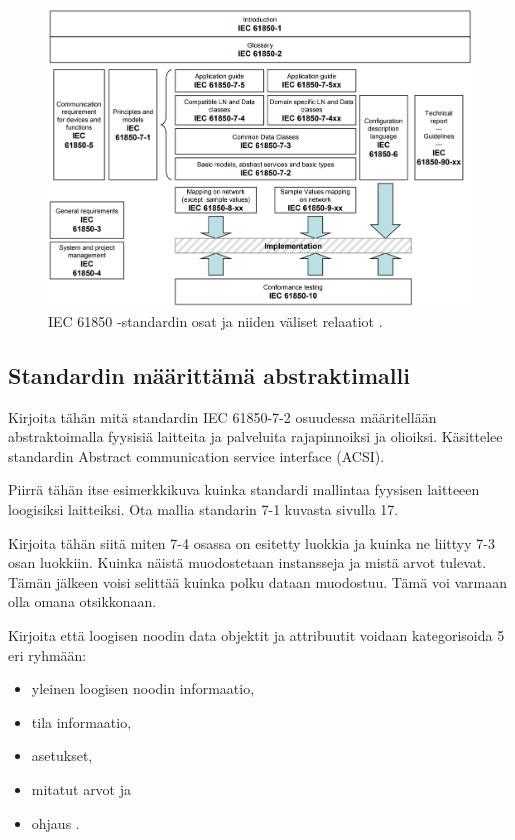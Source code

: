 \begin{figure}
	\includegraphics[width=1\textwidth]{pictures/iec-61850-series-and-relations.png}
	\caption{IEC 61850 -standardin osat ja niiden väliset relaatiot \cite[s.~14]{IEC61850-7-1}.}
	\label{fig:iec61850-osat-ja-relaatiot}
\end{figure}

\subsection{Standardin määrittämä abstraktimalli}
\begin{it}
	Kirjoita tähän mitä standardin IEC 61850-7-2 osuudessa määritellään abstraktoimalla fyysisiä laitteita ja palveluita rajapinnoiksi ja olioiksi. Käsittelee standardin Abstract communication service interface (ACSI).

	Piirrä tähän itse esimerkkikuva kuinka standardi mallintaa fyysisen laitteeen loogisiksi laitteiksi. Ota mallia standarin 7-1 kuvasta sivulla 17.

	Kirjoita tähän siitä miten 7-4 osassa on esitetty luokkia ja kuinka ne liittyy 7-3 osan luokkiin. Kuinka näistä muodostetaan instansseja ja mistä arvot tulevat. Tämän jälkeen voisi selittää kuinka polku dataan muodostuu. Tämä voi varmaan olla omana otsikkonaan.
	
	Kirjoita että loogisen noodin data objektit ja attribuutit voidaan kategorisoida 5 eri ryhmään:
	\begin{itemize}
		\item yleinen loogisen noodin informaatio,
		\item tila informaatio,
		\item asetukset, 
		\item mitatut arvot ja
		\item ohjaus \cite[s.~25]{IEC61850-1}.
	\end{itemize}
\end{it}

